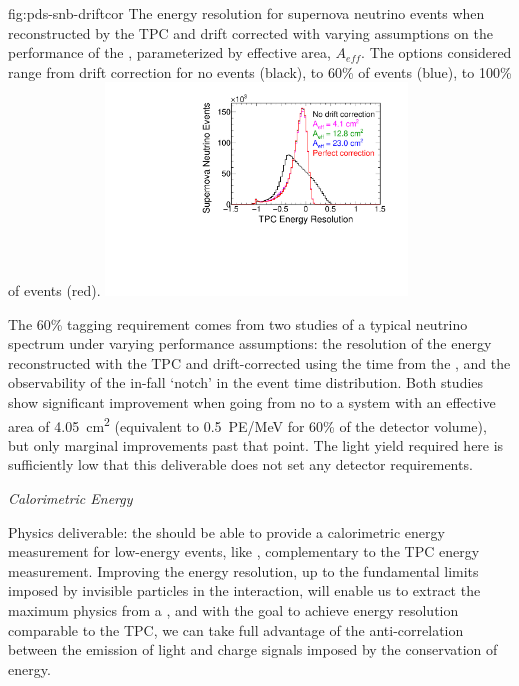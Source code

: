 \begin{dunefigure}
{fig:pds-snb-driftcor}
{The energy resolution for supernova neutrino events when reconstructed by the TPC and drift corrected with varying assumptions on the performance of the , parameterized by effective area, $A_{eff}$. The options considered range from drift correction for no events (black), to 60\% of events (blue), to 100\% of events (red).
}
  \includegraphics[width=0.6\textwidth]{graphics/pds-snb-drift-corr}
 \end{dunefigure}

The 60\% \tzero tagging requirement comes from two studies of a typical  neutrino spectrum under varying  performance assumptions: the resolution of the energy reconstructed with the TPC and drift-corrected using the time from the , and the observability of the in-fall `notch' in the  event time distribution. Both studies show significant improvement when going from no  to a system with an effective area of \SI{4.05}{cm^2} (equivalent to \SI{0.5}{PE/MeV} for 60\% of the detector volume), but only marginal improvements past that point. The light yield required here is sufficiently low that this deliverable does not set any detector requirements.


\textit{Calorimetric Energy}

Physics deliverable: the  should be able to provide a calorimetric energy measurement for low-energy events, like , complementary to the TPC energy measurement. 
Improving the energy resolution, up to the fundamental limits imposed by invisible particles in the interaction, will enable us to extract the maximum physics from a , and with the goal to achieve energy resolution comparable to the TPC, we can take full advantage of the anti-correlation between the emission of light and charge signals imposed by the conservation of energy.


